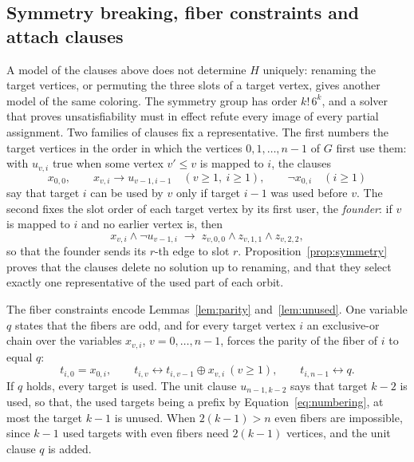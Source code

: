 \documentclass[11pt]{article}
\theoremstyle{definition}
\theoremstyle{remark}
\begin{document}
\subsection{Symmetry breaking, fiber constraints and attach clauses}\label{sec:symmetry}

A model of the clauses above does not determine $H$ uniquely: renaming the target vertices, or permuting the three slots of a target vertex, gives another model of the same
coloring. The symmetry group has order $k!\,6^k$, and a solver that proves unsatisfiability must in effect refute every image of every partial assignment. Two families of
clauses fix a representative. The first numbers the target vertices in the order in which the vertices $0, 1, \dots, n-1$ of $G$ first use them: with
$u_{v,i}$ true when some vertex $v' \le v$ is mapped to $i$, the clauses
\begin{equation}\label{eq:numbering}
x_{0,0}, \qquad x_{v,i} \to u_{v-1,i-1} \quad (v \ge 1,\ i \ge 1), \qquad \neg x_{0,i} \quad (i \ge 1)
\end{equation}
say that target $i$ can be used by $v$ only if target $i-1$ was used before $v$. The second fixes the slot order of each target vertex by its first user, the
\emph{founder}: if $v$ is mapped to $i$ and no earlier vertex is, then
\begin{equation}\label{eq:founder}
x_{v,i} \wedge \neg u_{v-1,i} \;\to\; z_{v,0,0} \wedge z_{v,1,1} \wedge z_{v,2,2},
\end{equation}
so that the founder sends its $r$-th edge to slot $r$. Proposition~\ref{prop:symmetry} proves that the clauses delete no solution up to renaming, and that they select
exactly one representative of the used part of each orbit.

The fiber constraints encode Lemmas~\ref{lem:parity} and~\ref{lem:unused}. One variable $q$ states that the fibers are odd, and for every target vertex $i$ an exclusive-or
chain over the variables $x_{v,i}$, $v = 0, \dots, n-1$, forces the parity of the fiber of $i$ to equal $q$:
\begin{equation}\label{eq:xor}
t_{i,0} = x_{0,i},\qquad t_{i,v} \leftrightarrow t_{i,v-1} \oplus x_{v,i}\ (v \ge 1),\qquad t_{i,n-1} \leftrightarrow q.
\end{equation}
If $q$ holds, every target is used. The unit clause $u_{n-1,k-2}$ says that target $k-2$ is used, so that, the used targets being a prefix by Equation~\eqref{eq:numbering},
at most the target $k-1$ is unused. When $2(k-1) > n$ even fibers are impossible, since $k-1$ used targets with even fibers need $2(k-1)$ vertices, and the unit clause $q$ is added.
\end{document}
